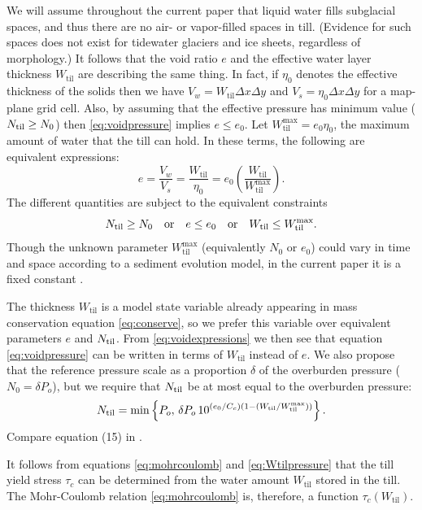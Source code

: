 \documentclass[gmd]{copernicus}   %
\newcommand{\text}{\textrm}
\newcommand{\Wtil}{W_{\text{til}}}
\newcommand{\Wtilmax}{W_{\text{til}}^{\text{max}}}
\begin{document}
We will assume throughout the current paper that liquid water fills subglacial spaces, and thus there are no air- or vapor-filled spaces in till.  (Evidence for such spaces does not exist for tidewater glaciers and ice sheets, regardless of morphology.)  It follows that the void ratio $e$ and the effective water layer thickness $\Wtil$ are describing the same thing.  In fact, if $\eta_0$ denotes the effective thickness of the solids then we have $V_w = \Wtil \Delta x \Delta y$ and $V_s = \eta_0 \Delta x \Delta y$ for a map-plane grid cell.  Also, by assuming that the effective pressure has minimum value ($\Ntil \ge N_0$) then \eqref{eq:voidpressure} implies $e \le e_0$.  Let $\Wtilmax = e_0 \eta_0$, the maximum amount of water that the till can hold.  In these terms, the following are equivalent expressions:
\begin{equation}
e = \frac{V_w}{V_s} = \frac{\Wtil}{\eta_0} = e_0 \left(\frac{\Wtil}{\Wtilmax}\right). \label{eq:voidexpressions}
\end{equation}
The different quantities are subject to the equivalent constraints
\begin{equation}
\Ntil \ge N_0 \quad \text{or} \quad e\le e_0 \quad \text{or} \quad \Wtil \le \Wtilmax. \label{eq:Wtilupperbound}
\end{equation}
Though the unknown parameter $\Wtilmax$ (equivalently $N_0$ or $e_0$) could vary in time and space according to a sediment evolution model, in the current paper it is a fixed constant \citep{BBssasliding,TrufferEchelmeyerHarrison2001}.

The thickness $\Wtil$ is a model state variable already appearing in mass conservation equation \eqref{eq:conserve}, so we prefer this variable over equivalent parameters $e$ and $\Ntil$.  From \eqref{eq:voidexpressions} we then see that equation \eqref{eq:voidpressure} can be written in terms of $\Wtil$ instead of $e$.  We also propose that the reference pressure scale as a proportion $\delta$ of the overburden pressure ($N_0 = \delta P_o$), but we require that $\Ntil$ be at most equal to the overburden pressure:
\begin{equation}
\Ntil = \min\left\{P_o,\, \delta P_o \, 10^{(e_0/C_c) \left(1 - (\Wtil/\Wtilmax)\right)}\right\}. \label{eq:Wtilpressure}
\end{equation}
Compare equation (15) in \cite{vanderWeletal2013}.

It follows from equations \eqref{eq:mohrcoulomb} and \eqref{eq:Wtilpressure} that the till yield stress $\tau_c$ can be determined from the water amount $\Wtil$ stored in the till.  The Mohr-Coulomb relation \eqref{eq:mohrcoulomb} is, therefore, a function $\tau_c(\Wtil)$.
\end{document}
